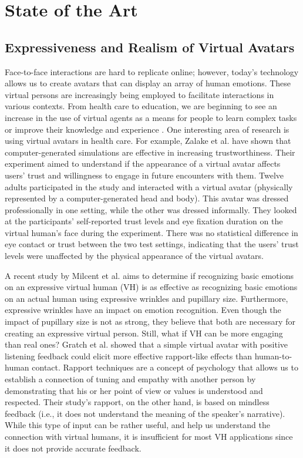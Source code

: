 \section{State of the Art}

\subsection{Expressiveness and Realism of Virtual Avatars}
Face-to-face interactions are hard to replicate online; however, today's technology allows us to create avatars that can display an array of human emotions. These virtual persons are increasingly being employed to facilitate interactions in various contexts. From health care to education, we are beginning to see an increase in the use of virtual agents as a means for people to learn complex tasks or improve their knowledge and experience \cite{MAR18, SHO19}. One interesting area of research is using virtual avatars in health care. For example, Zalake et al. \cite{ZAL18} have shown that computer-generated simulations are effective in increasing trustworthiness. Their experiment aimed to understand if the appearance of a virtual avatar affects users' trust and willingness to engage in future encounters with them. Twelve adults participated in the study and interacted with a virtual avatar (physically represented by a computer-generated head and body). This avatar was dressed professionally in one setting, while the other was dressed informally. They looked at the participants' self-reported trust levels and eye fixation duration on the virtual human's face during the experiment. There was no statistical difference in eye contact or trust between the two test settings, indicating that the users' trust levels were unaffected by the physical appearance of the virtual avatars.

A recent study by Milcent et al. \cite{MIL19} aims to determine if recognizing basic emotions on an expressive virtual human (VH) is as effective as recognizing basic emotions on an actual human using expressive wrinkles and pupillary size. Furthermore, expressive wrinkles have an impact on emotion recognition. Even though the impact of pupillary size is not as strong, they believe that both are necessary for creating an expressive virtual person. 
Still, what if VH can be more engaging than real ones? Gratch et al. \cite{GRA07} showed that a simple virtual avatar with positive listening feedback could elicit more effective rapport-like effects than human-to-human contact. Rapport techniques are a concept of psychology that allows us to establish a connection of tuning and empathy with another person by demonstrating that his or her point of view or values is understood and respected. Their study's rapport, on the other hand, is based on mindless feedback (i.e., it does not understand the meaning of the speaker's narrative). While this type of input can be rather useful, and help us understand the connection with virtual humans, it is insufficient for most VH applications since it does not provide accurate feedback.

